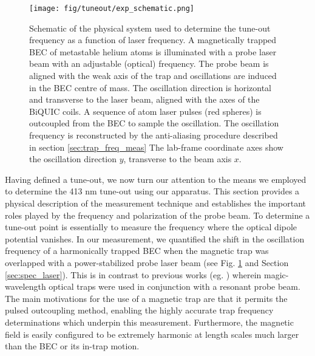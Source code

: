 	\begin{figure}
	\begin{minipage}{0.5\textwidth}
	\vspace{0pt}
	\texttt{[image: fig/tuneout/exp\_schematic.png]}
	\end{minipage}
	\hfill
	\begin{minipage}{0.5\textwidth}
	\vspace{0pt}
	\caption{
	Schematic of the physical system used to determine the tune-out frequency as a function of laser frequency. A magnetically trapped BEC of metastable helium atoms is illuminated with a probe laser beam with an adjustable (optical) frequency. The probe beam is aligned with the weak axis of the trap and oscillations are induced in the BEC centre of mass. The oscillation direction is horizontal and transverse to the laser beam, aligned with the axes of the BiQUIC coils.  A sequence of atom laser pulses (red spheres) is outcoupled from the BEC to sample the oscillation. The oscillation frequency is reconstructed by the anti-aliasing procedure described in section \ref{sec:trap_freq_meas}
	The lab-frame coordinate axes show the oscillation direction $y$, transverse to the beam axis $x$.
	}
	\label{fig:exp_schematic} 
	\end{minipage}
	\end{figure}

	Having defined a tune-out, we now turn our attention to the means we employed to determine the 413 nm tune-out using our apparatus. 
	This section provides a physical description of the measurement technique and establishes the important roles played by the frequency and polarization of the probe beam.
	To determine a tune-out point is essentially to measure the frequency where the optical dipole potential  vanishes.
	In our measurement, we quantified the shift in the oscillation frequency of a harmonically trapped BEC when the magnetic trap was overlapped with a power-stabilized probe laser beam (see Fig. \ref{fig:exp_schematic} and Section \ref{sec:spec_laser}). 
	This is in contrast to previous works (eg. \cite{Rengelink18}) wherein magic-wavelength optical traps were used in conjunction with a resonant probe beam. 
	The main motivations for the use of a magnetic trap are that it permits the pulsed outcoupling method, enabling the highly accurate trap frequency determinations which underpin this measurement. Furthermore, the magnetic field is easily configured to be extremely harmonic at length scales much larger than the BEC or its in-trap motion.

